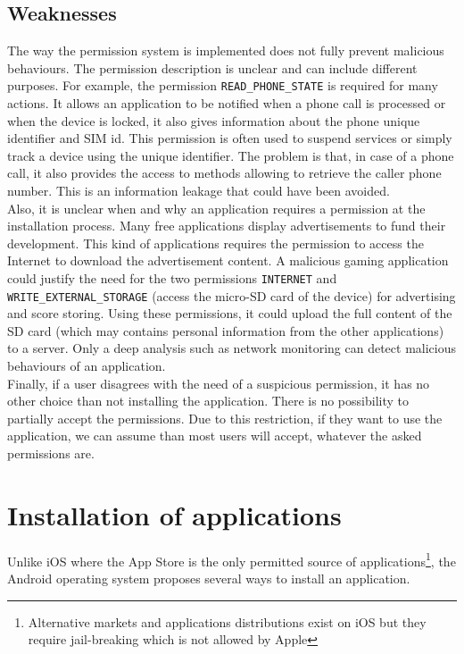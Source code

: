\subsection{Weaknesses}

The way the permission system is implemented does not fully prevent malicious behaviours.
The permission description is unclear and can include different purposes.
For example, the permission \texttt{READ\_PHONE\_STATE} is required for many actions.
It allows an application to be notified when a phone call is processed or when the device is locked, it also gives information about the phone unique identifier and SIM id.
This permission is often used to suspend services or simply track a device using the unique identifier.
The problem is that, in case of a phone call, it also provides the access to methods allowing to retrieve the caller phone number.
This is an information leakage that could have been avoided.\\

Also, it is unclear when and why an application requires a permission at the installation process.
Many free applications display advertisements to fund their development.
This kind of applications requires the permission to access the Internet to download the advertisement content.
A malicious gaming application could justify the need for the two permissions \texttt{INTERNET} and \texttt{WRITE\_EXTERNAL\_STORAGE} (access the micro-SD card of the device) for advertising and score storing.
Using these permissions, it could upload the full content of the SD card (which may contains personal information from the other applications) to a server.
Only a deep analysis such as network monitoring can detect malicious behaviours of an application.\\

Finally, if a user disagrees with the need of a suspicious permission, it has no other choice than not installing the application.
There is no possibility to partially accept the permissions.
Due to this restriction, if they want to use the application, we can assume than most users will accept, whatever the asked permissions are.

\section{Installation of applications}

Unlike iOS where the App Store is the only permitted source of applications\footnote{Alternative markets and applications distributions exist on iOS but they require jail-breaking which is not allowed by Apple}, the Android operating system proposes several ways to install an application.

